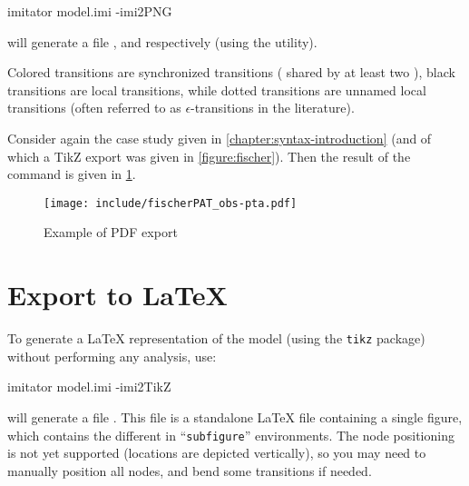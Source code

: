 \begin{terminal}
imitator model.imi -imi2PNG
\end{terminal}

\imitator{} will generate a file ,  and  respectively (using the \gdot{} utility).

Colored transitions are synchronized transitions (\ie{} shared by at least two \IPTA{}), black transitions are local transitions, while dotted transitions are unnamed local transitions (often referred to as $\epsilon$-transitions in the literature).

\begin{example}
	Consider again the case study given in \cref{chapter:syntax-introduction} (and of which a TikZ export was given in \cref{figure:fischer}).
	Then the result of the  command is given in \cref{figure:PDF-export}.
\end{example}

\begin{figure}
	\texttt{[image: include/fischerPAT\_obs-pta.pdf]}

	\caption{Example of PDF export}
	\label{figure:PDF-export}
\end{figure}




\section{Export to \LaTeX{}}

To generate a \LaTeX{} representation of the \NIPTA{} model (using the \texttt{tikz} package) without performing any analysis, use:

\begin{terminal}
imitator model.imi -imi2TikZ
\end{terminal}

\imitator{} will generate a file .
This file is a standalone \LaTeX{} file containing a single figure, which contains the different \IPTA{} in ``\texttt{subfigure}'' environments.
The node positioning is not yet supported (locations are depicted vertically), so you may need to manually position all nodes, and bend some transitions if needed.


